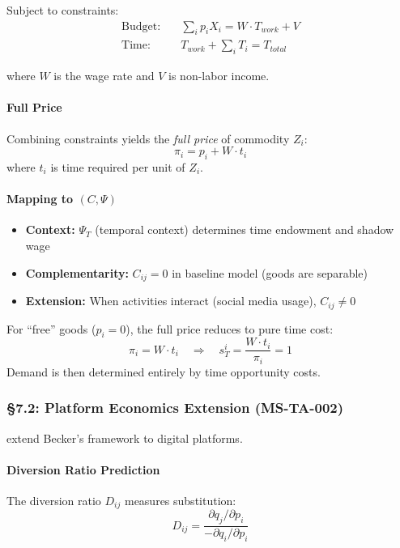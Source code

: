 Subject to constraints:
\begin{align}
\text{Budget:} \quad & \sum_i p_i X_i = W \cdot T_{work} + V \\
\text{Time:} \quad & T_{work} + \sum_i T_i = T_{total}
\end{align}

where $W$ is the wage rate and $V$ is non-labor income.

\paragraph{Full Price}
Combining constraints yields the \emph{full price} of commodity $Z_i$:
\begin{equation}
\pi_i = p_i + W \cdot t_i
\label{eq:der-full-price}
\end{equation}
where $t_i$ is time required per unit of $Z_i$.

\paragraph{Mapping to $(C, \Psi)$}
\begin{itemize}
\item \textbf{Context:} $\Psi_T$ (temporal context) determines time endowment and shadow wage
\item \textbf{Complementarity:} $C_{ij} = 0$ in baseline model (goods are separable)
\item \textbf{Extension:} When activities interact (social media usage), $C_{ij} \neq 0$
\end{itemize}

\begin{proposition}
\label{prop:der-ta1}
For ``free'' goods ($p_i = 0$), the full price reduces to pure time cost:
\[
\pi_i = W \cdot t_i \quad \Rightarrow \quad s_T^i = \frac{W \cdot t_i}{\pi_i} = 1
\]
Demand is then determined entirely by time opportunity costs.
\end{proposition}

\subsubsection{§7.2: Platform Economics Extension (MS-TA-002)}

\citet{PAP-goodman2026timeintensive} extend Becker's framework to digital platforms.

\paragraph{Diversion Ratio Prediction}
The diversion ratio $D_{ij}$ measures substitution:
\begin{equation}
D_{ij} = \frac{\partial q_j / \partial p_i}{-\partial q_i / \partial p_i}
\label{eq:der-diversion}
\end{equation}

